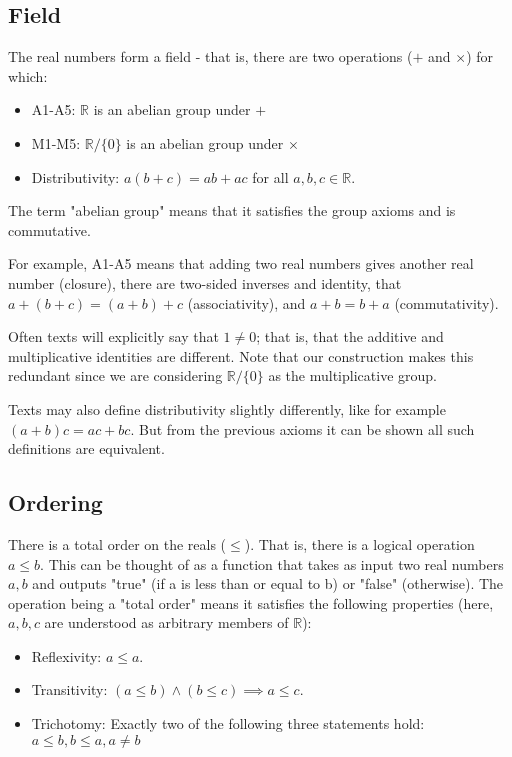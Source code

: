 \documentclass{article}
\newcommand{\0}{{\bf{0}}}
\begin{document}
\subsection{Field}
The real numbers form a field - that is, there are two operations ($+$ and $\times$) for which:
\begin{itemize}
    \item A1-A5: $\mathbb{R}$ is an abelian group under $+$
    \item M1-M5: $\mathbb{R}/\{0\}$ is an abelian group under $\times$
    \item Distributivity: $a(b+c) = ab+ac$ for all $a,b,c \in \mathbb{R}.$
\end{itemize}
The term "abelian group" means that it satisfies the group axioms and is commutative. 

For example, A1-A5 means that adding two real numbers gives another real number (closure), there are two-sided inverses and identity, that $a+(b+c) = (a+b)+c$ (associativity), and $a+b=b+a$ (commutativity).

Often texts will explicitly say that $1 \neq 0$; that is, that the additive and multiplicative identities are different. Note that our construction makes this redundant since we are considering $\mathbb{R}/\{0\}$ as the multiplicative group. 

Texts may also define distributivity slightly differently, like for example $(a+b)c = ac+bc.$ But from the previous axioms it can be shown all such definitions are equivalent.
\subsection{Ordering}
There is a total order on the reals ($\leq$).
That is, there is a logical operation $a \leq b.$ This can be thought of as a function that takes as input two real numbers $a,b$ and outputs "true" (if a is less than or equal to b) or "false" (otherwise).
The operation being a "total order" means it satisfies the following properties (here, $a,b,c$ are understood as arbitrary members of $\mathbb{R}$):
\begin{itemize}
    \item Reflexivity: $ a \leq a.$
    \item Transitivity: $(a \leq b) \land (b \leq c) \implies a \leq c.$
    \item Trichotomy: Exactly two of the following three statements hold: $a \leq b, b \leq a, a \neq b$
\end{itemize}
\end{document}
